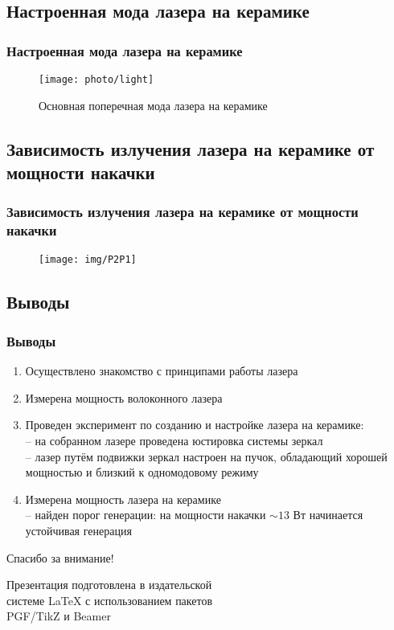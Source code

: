 \documentclass[10pt,pdf,hyperref={unicode}, dvipsnames]{beamer}
\newcommand\frametitless[1]{\subsection{#1}\frametitle{#1}}
\begin{document}
\begin{frame}[t]
	\frametitless{Настроенная мода лазера на керамике}
	\vfill
			\begin{figure}[h]
				\centering
				\texttt{[image: photo/light]}
				\caption{Основная поперечная мода лазера на керамике}
			\end{figure}	
	\vfill
\end{frame}
\begin{frame}[t]
	\frametitless{Зависимость излучения лазера на керамике от мощности накачки}
		\begin{figure}[tb]
		\centering
		\texttt{[image: img/P2P1]}
	\end{figure}
\end{frame}
\begin{frame}
	\frametitless{Выводы}
	\begin{enumerate}
		\item Осуществлено знакомство с принципами работы  лазера
		\item Измерена мощность волоконного лазера
		\item Проведен эксперимент по созданию и настройке лазера на керамике:\\
		\vspace{0.5em}
		-- на собранном лазере проведена юстировка системы зеркал\\
		-- лазер путём подвижки зеркал настроен на пучок, обладающий хорошей мощностью и близкий к одномодовому режиму
		\vspace{0.5em}
		\item Измерена мощность лазера на керамике\\
		\vspace{0.5em}
		-- найден порог генерации: на мощности накачки $\sim13$ Вт начинается устойчивая генерация
	\end{enumerate}
\end{frame}


\begin{frame}[plain]
	\vspace{4cm}
	\begin{center}
		\Huge
		Спасибо за внимание!
	\end{center}
	\vspace{2.5cm}
	\begin{center}
		\color{black!30!white}
		Презентация подготовлена в издательской \\
		системе LaTeX с использованием пакетов \\
		PGF/TikZ и Beamer
	\end{center}
\end{frame}
\end{document}
